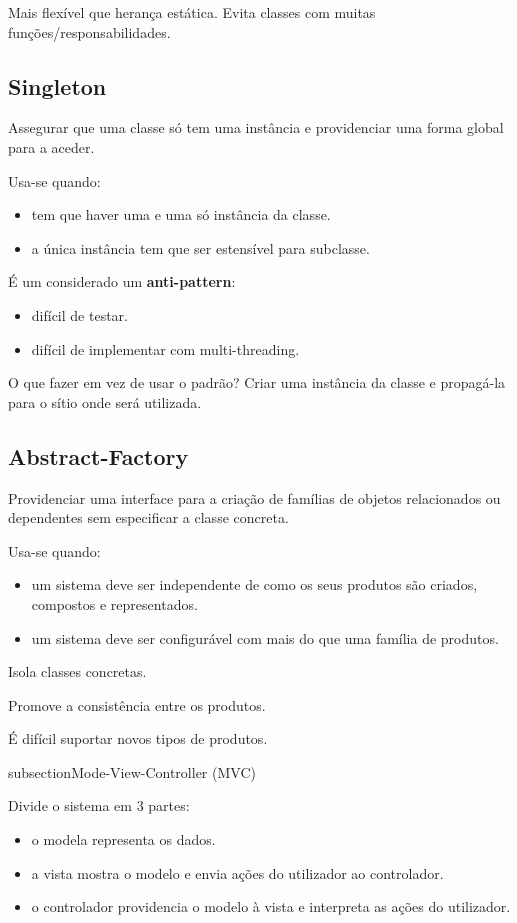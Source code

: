\documentclass[../resumosLPOO.tex]{subfiles}
\begin{document}
Mais flexível que herança estática. Evita classes com muitas funções/responsabilidades.


\subsection{Singleton}

Assegurar que uma classe só tem uma instância e providenciar uma forma global para a aceder.

Usa-se quando:
\begin{itemize}
    \item tem que haver uma e uma só instância da classe.
    \item a única instância tem que ser estensível para subclasse.
\end{itemize}

É um considerado um \textbf{anti-pattern}:
\begin{itemize}
    \item difícil de testar.
    \item difícil de implementar com multi-threading.
\end{itemize}

O que fazer em vez de usar o padrão? Criar uma instância da classe e propagá-la para o sítio onde será utilizada.


\subsection{Abstract-Factory}

Providenciar uma interface para a criação de famílias de objetos relacionados ou dependentes sem especificar a classe concreta.

Usa-se quando:
\begin{itemize}
    \item um sistema deve ser independente de como os seus produtos são criados, compostos e representados.
    \item um sistema deve ser configurável com mais do que uma família de produtos.
\end{itemize}

Isola classes concretas.

Promove a consistência entre os produtos.

É difícil suportar novos tipos de produtos.

subsection{Mode-View-Controller (MVC)}

Divide o sistema em 3 partes:
\begin{itemize}
    \item o modela representa os dados.
    \item a vista mostra o modelo e envia ações do utilizador ao controlador.
    \item o controlador providencia o modelo à vista e interpreta as ações do utilizador.
\end{itemize}
\end{document}
